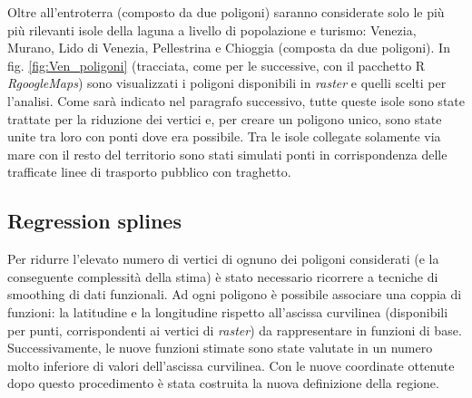 \documentclass[a4paper,11pt,twoside,openright]{book}							%
\begin{document}
Oltre all'entroterra (composto da due poligoni) saranno considerate solo le più più rilevanti isole della laguna a livello di popolazione e turismo: Venezia, Murano, Lido di Venezia, Pellestrina e Chioggia (composta da due poligoni). In fig. \ref{fig:Ven_poligoni} (tracciata, come per le successive, con il pacchetto R \textit{RgoogleMaps}) sono visualizzati i poligoni disponibili in \textit{raster} e quelli scelti per l'analisi. Come sarà indicato nel paragrafo successivo, tutte queste isole sono state trattate per la riduzione dei vertici e, per creare un poligono unico, sono state unite tra loro con ponti dove era possibile. Tra le isole collegate solamente via mare con il resto del territorio sono stati simulati ponti in corrispondenza delle trafficate linee di trasporto pubblico con traghetto. 

\subsection{Regression splines}

Per ridurre l'elevato numero di vertici di ognuno dei poligoni considerati (e la conseguente complessità della stima) è stato necessario ricorrere a tecniche di smoothing di dati funzionali. Ad ogni poligono è possibile associare una coppia di funzioni: la latitudine e la longitudine rispetto all'ascissa curvilinea (disponibili per punti, corrispondenti ai vertici di \textit{raster}) da rappresentare in funzioni di base. Successivamente, le nuove funzioni stimate sono state valutate in un numero molto inferiore di valori dell'ascissa curvilinea. Con le nuove coordinate ottenute dopo questo procedimento è stata costruita la nuova definizione della regione.
\end{document}
